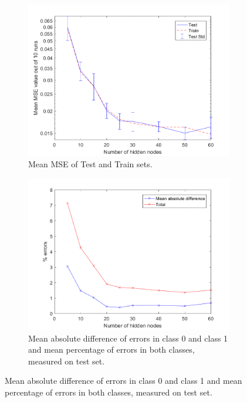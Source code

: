 \documentclass[a4paper, 11pt]{article}
\begin{document}
\begin{figure}[h]
    \centering
    \begin{subfigure}[t]{0.32\textwidth}
        \includegraphics[width=\textwidth]{../figures/perf/mseplot_m(5-60)_e(10-10).png}
        \caption{Mean MSE of Test and Train sets.}
        \label{fig:mse}
    \end{subfigure}
    \hfill %
    \begin{subfigure}[t]{0.32\textwidth}
        \includegraphics[width=\textwidth]{../figures/perf/errorplot_m(5-60)_e(10-10).png}
        \caption{Mean absolute difference of errors in class 0 and class 1 and mean percentage of errors in both classes, measured on test set.}

\end{subfigure}
\end{figure}
\end{document}
